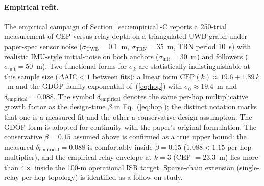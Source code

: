 \documentclass[journal,10pt,twocolumn]{IEEEtran}
\begin{document}
\paragraph*{Empirical refit.}
The empirical campaign of Section~\ref{sec:empirical}-C reports a 250-trial measurement of CEP versus relay depth on a triangulated UWB graph under paper-spec sensor noise ($\sigma_\text{UWB}=0.1$~m, $\sigma_\text{TRN}=35$~m, TRN period 10~s) with realistic IMU-style initial-noise on both anchors ($\sigma_\text{init}=30$~m) and followers ($\sigma_\text{init}=50$~m). Two functional forms for $\sigma_k$ are statistically indistinguishable at this sample size ($\Delta\mathrm{AIC} < 1$ between fits): a linear form $\mathrm{CEP}(k)\approx 19.6 + 1.89\,k$~m and the GDOP-family exponential of~(\ref{eq:hop}) with $\sigma_0\approx 19.4$~m and $\delta_\text{empirical}=0.088$. The symbol $\delta_\text{empirical}$ denotes the same per-hop multiplicative growth factor as the design-time $\beta$ in Eq.~(\ref{eq:hop}); the distinct notation marks that one is a measured fit and the other a conservative design assumption. The GDOP form is adopted for continuity with the paper's original formulation. The conservative $\beta=0.15$ assumed above is confirmed as a true upper bound: the measured $\delta_\text{empirical}=0.088$ is comfortably inside $\beta=0.15$ ($1.088 < 1.15$ per-hop multiplier), and the empirical relay envelope at $k{=}3$ (CEP $=23.3$~m) lies more than $4\times$ inside the 100-m operational ISR target. Sparse-chain extension (single-relay-per-hop topology) is identified as a follow-on study.
\end{document}
